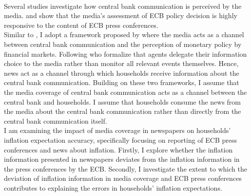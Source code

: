 \documentclass[review]{elsarticle}
\begin{document}
%
%
\\
Several studies investigate how central bank communication is perceived by the media. \cite{Berger2011} and \cite{Picaultetal2022} show that the media's assessment of ECB policy decision is highly responsive to the content of ECB press conferences. %
%
%
\\
Similar to \cite{Picaultetal2022}, I adopt a framework proposed by \cite{HayoNeuenkirch2015} where the media acts as a channel between central bank communication and the perception of monetary policy by financial markets. Following \cite{Nimark2019} who formalize that agents delegate their information choice to the media rather than monitor all relevant events themselves. Hence, news act as a channel through which households receive information about the central bank communication. Building on these two frameworks, I assume that the media coverage of central bank communication acts as a channel between the central bank and households. I assume that households consume the news from the media about the central bank communication rather than directly from the central bank communication itself. 
%
%
%
\\
I am examining the impact of media coverage in newspapers on households' inflation expectation accuracy, specifically focusing on reporting of ECB press conferences and news about inflation. Firstly, I explore whether the inflation information presented in newspapers deviates from the inflation information in the press conferences by the ECB. Secondly, I investigate the extent to which the deviation of inflation information in media coverage and ECB press conferences contributes to explaining the errors in households' inflation expectations.
%
\end{document}
